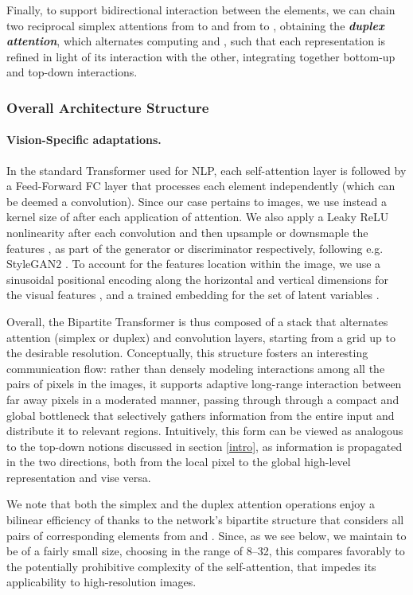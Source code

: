 \documentclass{article}
\begin{document}
Finally, to support bidirectional interaction between the elements, we can chain two reciprocal simplex attentions from  to  and from  to , obtaining the \textbf{\textit{duplex attention}}, which  alternates computing  and , such that each representation is refined in light of its interaction with the other, integrating together bottom-up and top-down interactions.

\subsubsection{Overall Architecture Structure}
\paragraph{Vision-Specific adaptations.} In the standard Transformer used for NLP, each self-attention layer is followed by a Feed-Forward FC layer that processes each element independently (which can be deemed a  convolution). Since our case pertains to images, we use instead a kernel size of  after each application of attention. We also apply a Leaky ReLU nonlinearity after each convolution \citep{lrelu} and then upsample or downsmaple the features , as part of the generator or discriminator respectively, following e.g. StyleGAN2 \citep{stylegan2}. To account for the features location within the image, we use a sinusoidal positional encoding along the horizontal and vertical dimensions for the visual features  \citep{transformer}, and a trained embedding for the set of latent variables .

Overall, the Bipartite Transformer is thus composed of a stack that alternates attention (simplex or duplex) and convolution layers, starting from a  grid up to the desirable resolution. Conceptually, this structure fosters an interesting communication flow: rather than densely modeling interactions among all the pairs of pixels in the images, it supports adaptive long-range interaction between far away pixels in a moderated manner, passing through through a compact and global bottleneck that selectively gathers information from the entire input and distribute it to relevant regions. Intuitively, this form can be viewed as analogous to the top-down notions discussed in section \ref{intro}, as information is propagated in the two directions, both from the local pixel to the global high-level representation and vise versa.

We note that both the simplex and the duplex attention operations enjoy a bilinear efficiency of  thanks to the network's bipartite structure that considers all pairs of corresponding elements from  and . Since, as we see below, we maintain  to be of a fairly small size, choosing  in the range of 8--32, this compares favorably to the potentially prohibitive  complexity of the self-attention, that impedes its applicability to high-resolution images. 
\end{document}
